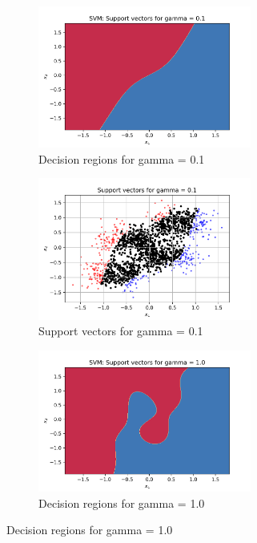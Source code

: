 \documentclass[a4paper]{article}    %
\begin{document}
\begin{figure}[H]
    \centering
    \begin{subfigure}{0.45\textwidth}
        \centering
        \includegraphics[width=7cm]{decision_region_gamma_0d1}
        \caption{Decision regions for gamma = 0.1}
        \label{fig:svm-decision_region_gamma_0d1}
    \end{subfigure}
    \hfill
    \begin{subfigure}{0.45\textwidth}
        \centering
        \includegraphics[width=7cm]{support_vectors_gamma_0d1}
        \caption{Support vectors for gamma = 0.1}
        \label{fig:svm-support_vectors_gamma_0d1}
    \end{subfigure}
    \begin{subfigure}{0.45\textwidth}
        \centering
        \includegraphics[width=7cm]{decision_region_gamma_1}
        \caption{Decision regions for gamma = 1.0}
        \label{fig:svm-decision_region_gamma_1}

\end{subfigure}
\end{figure}
\end{document}
